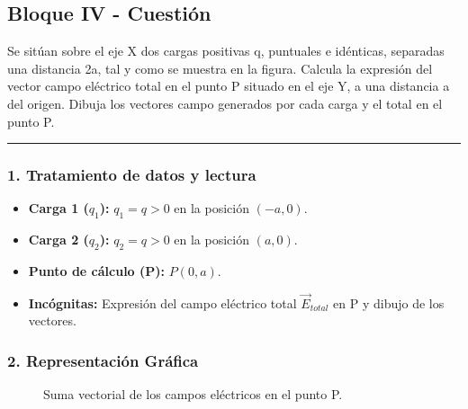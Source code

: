 \subsection{Bloque IV - Cuestión}
\label{subsec:B4_2017_jul_ext}

\begin{cajaenunciado}
Se sitúan sobre el eje X dos cargas positivas q, puntuales e idénticas, separadas una distancia 2a, tal y como se muestra en la figura. Calcula la expresión del vector campo eléctrico total en el punto P situado en el eje Y, a una distancia a del origen. Dibuja los vectores campo generados por cada carga y el total en el punto P.
\end{cajaenunciado}
\hrule

\subsubsection*{1. Tratamiento de datos y lectura}
\begin{itemize}
    \item \textbf{Carga 1 ($q_1$):} $q_1=q>0$ en la posición $(-a,0)$.
    \item \textbf{Carga 2 ($q_2$):} $q_2=q>0$ en la posición $(a,0)$.
    \item \textbf{Punto de cálculo (P):} $P(0,a)$.
    \item \textbf{Incógnitas:} Expresión del campo eléctrico total $\vec{E}_{total}$ en P y dibujo de los vectores.
\end{itemize}

\subsubsection*{2. Representación Gráfica}
\begin{figure}[H]
    \centering
    \caption{Suma vectorial de los campos eléctricos en el punto P.}
\end{figure}

